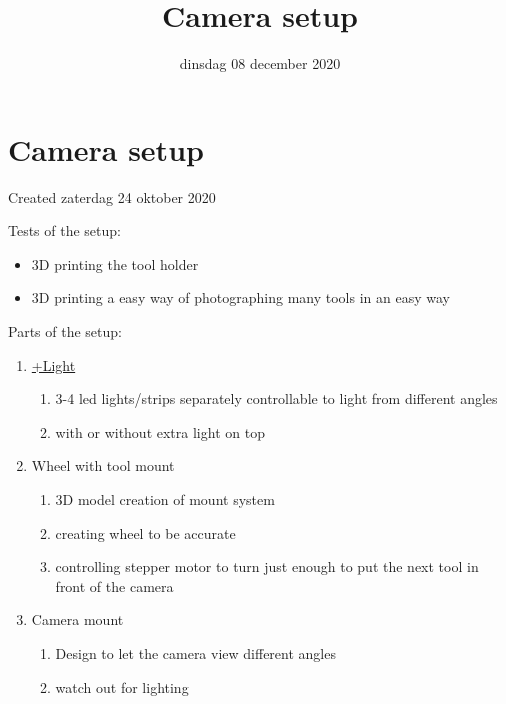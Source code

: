 \documentclass{scrartcl}
\title{Camera setup}
\date{dinsdag 08 december 2020}
\author{}
\begin{document}
\maketitle

		\section{Camera setup}

Created zaterdag 24 oktober 2020



Tests of the setup: 

\begin{itemize}
\item 3D printing the tool holder
\item 3D printing a easy way of photographing many tools in an easy way
\end{itemize}




Parts of the setup:

\begin{enumerate}[1]
\item \href{./Camera_setup/Light.tex}{+Light}
	\begin{enumerate}[a]
	\item 3-4 led lights/strips separately controllable to light from different angles
	\item with or without extra light on top
	\end{enumerate}
\item Wheel with tool mount
	\begin{enumerate}[a]
	\item 3D model creation of mount system
	\item creating wheel to be accurate
	\item controlling stepper motor to turn just enough to put the next tool in front of the camera
	\end{enumerate}
\item Camera mount
	\begin{enumerate}[a]
	\item Design to let the camera view different angles
	\item watch out for lighting
	\end{enumerate}
\end{enumerate}
\end{document}
